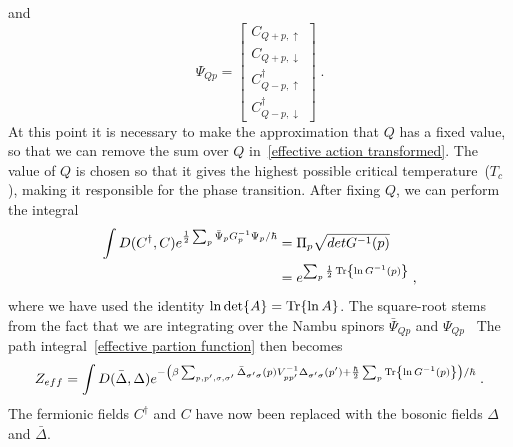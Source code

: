 \documentclass{article}
\begin{document}
and
\begin{equation}
   \Psi_{Q p} = 
\begin{bmatrix}
     C_{Q + p,\uparrow} \\
     C_{Q + p,\downarrow}  \\
     C^{\dagger}_{Q - p,\uparrow}  \\
     C^{\dagger}_{Q - p,\downarrow}
\end{bmatrix}\;.
\end{equation} 
At this point it is necessary to make the approximation that $Q$ has a fixed value, so that we can remove the sum over $Q$ in~\cref{effective action transformed}. The value of $Q$ is chosen so that it gives the highest possible critical temperature~($T_c$), making it responsible for the phase transition. After fixing $Q$, we can perform the integral  
\begin{align}
    \int D(C^{\dagger},C) e^{\frac{1}{2} \sum_{p} \bar{\Psi}_{p} G^{-1}_ {p} \Psi_{p} / \hbar} &= \Pi_p \sqrt{det{G^{-1}(p)}} \nonumber\\
                                                                                               &= e^{\sum_p \frac{1}{2}\Tr{\ln{G^{-1}(p)}}} \;\nonumber,
\end{align}
where we have used the identity $\ln{\det{A}} = \Tr{\ln{A}}$. The square-root stems from the fact that we are integrating over the Nambu spinors $\bar{\Psi}_{Q p}$ and $\Psi_{Q p}$~\cite{Wegner2016,Hugdal2019}  The path integral~\cref{effective partion function} then becomes
\begin{equation}
    Z_{eff} = \int D(\bar{\Delta}, \Delta) e^{-\left(\beta\sum_{p,p',\sigma,\sigma'} \bar{\Delta}_{\sigma' \sigma}(p) V^{-1}_{p p'} \Delta_{\sigma' \sigma}(p') + \frac{\hbar}{2} \sum_p \Tr{\ln{G^{-1}(p)}}\right) / \hbar}\;. 
\end{equation}
The fermionic fields $C^{\dagger}$ and $C$ have now been replaced with the bosonic fields $\Delta$ and $\bar{\Delta}$.
\end{document}
